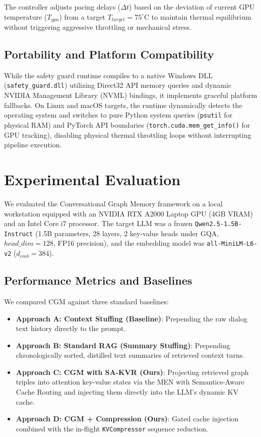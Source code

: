 \documentclass[conference]{IEEEtran}
\begin{document}
The controller adjusts pacing delays ($\Delta t$) based on the deviation of current GPU temperature ($T_{gpu}$) from a target $T_{target} = 75^\circ\text{C}$ to maintain thermal equilibrium without triggering aggressive throttling or mechanical stress.

\subsection{Portability and Platform Compatibility}
While the safety guard runtime compiles to a native Windows DLL (\texttt{safety\_guard.dll}) utilizing Direct32 API memory queries and dynamic NVIDIA Management Library (NVML) bindings, it implements graceful platform fallbacks. On Linux and macOS targets, the runtime dynamically detects the operating system and switches to pure Python system queries (\texttt{psutil} for physical RAM) and PyTorch API boundaries (\texttt{torch.cuda.mem\_get\_info()} for GPU tracking), disabling physical thermal throttling loops without interrupting pipeline execution.

\section{Experimental Evaluation}
We evaluated the Conversational Graph Memory framework on a local workstation equipped with an NVIDIA RTX A2000 Laptop GPU (4GB VRAM) and an Intel Core i7 processor. The target LLM was a frozen \texttt{Qwen2.5-1.5B-Instruct} (1.5B parameters, 28 layers, 2 key-value heads under GQA, $head\_dim=128$, FP16 precision), and the embedding model was \texttt{all-MiniLM-L6-v2} ($d_{emb}=384$).

\subsection{Performance Metrics and Baselines}
We compared CGM against three standard baselines:
\begin{itemize}
    \item \textbf{Approach A: Context Stuffing (Baseline)}: Prepending the raw dialog text history directly to the prompt.
    \item \textbf{Approach B: Standard RAG (Summary Stuffing)}: Prepending chronologically sorted, distilled text summaries of retrieved context turns.
    \item \textbf{Approach C: CGM with SA-KVR (Ours)}: Projecting retrieved graph triples into attention key-value states via the MEN with Semantics-Aware Cache Routing and injecting them directly into the LLM's dynamic KV cache.
    \item \textbf{Approach D: CGM + Compression (Ours)}: Gated cache injection combined with the in-flight \texttt{KVCompressor} sequence reduction.
\end{itemize}
\end{document}
